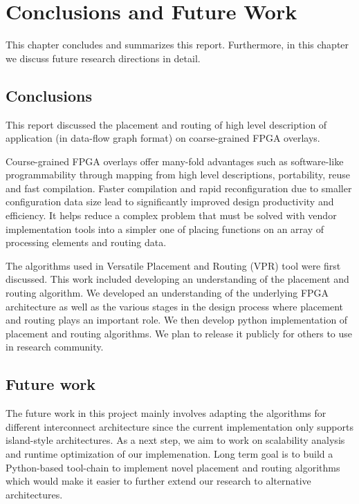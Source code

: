 \chapter{Conclusions and Future Work}
\label{ch7_conclusion}
This chapter concludes and summarizes this report.
Furthermore, in this chapter we discuss future research directions in detail.

\section{Conclusions}
This report discussed the placement and routing of high level description of application (in data-flow graph format) on coarse-grained FPGA overlays. 

Course-grained FPGA overlays offer many-fold advantages such as software-like programmability through mapping from high level descriptions, portability, reuse and fast compilation. 
Faster compilation and rapid reconfiguration due to smaller configuration data size lead to significantly improved design productivity and efficiency. 
It helps reduce a complex problem that must be solved with vendor implementation tools into a simpler one of placing functions on an array of processing elements and routing data.

The algorithms used in Versatile Placement and Routing (VPR) tool were first discussed.
This work included developing an understanding of the placement and routing algorithm. 
We developed an understanding of the underlying FPGA architecture as well as the various stages in the design process where placement and routing plays an important role. 
We then develop python implementation of placement and routing algorithms.
We plan to release it publicly for others to use in research community.


\section{Future work}

The future work in this project mainly involves adapting the algorithms for different interconnect architecture since the current implementation only supports island-style architectures. 
As a next step, we aim to work on scalability analysis and runtime optimization of our implemenation. 
Long term goal is to build a Python-based tool-chain to implement novel placement and routing algorithms which would make it easier to further extend our research to alternative architectures.

